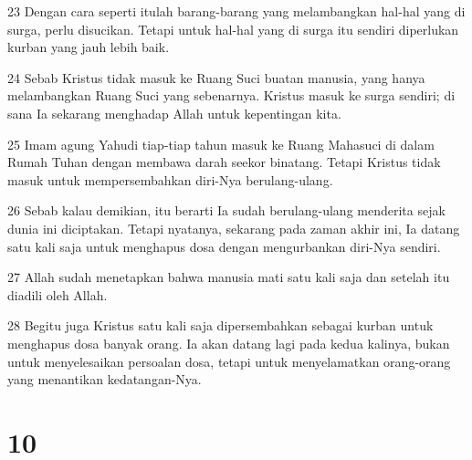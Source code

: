 \par 23 Dengan cara seperti itulah barang-barang yang melambangkan hal-hal yang di surga, perlu disucikan. Tetapi untuk hal-hal yang di surga itu sendiri diperlukan kurban yang jauh lebih baik.
\par 24 Sebab Kristus tidak masuk ke Ruang Suci buatan manusia, yang hanya melambangkan Ruang Suci yang sebenarnya. Kristus masuk ke surga sendiri; di sana Ia sekarang menghadap Allah untuk kepentingan kita.
\par 25 Imam agung Yahudi tiap-tiap tahun masuk ke Ruang Mahasuci di dalam Rumah Tuhan dengan membawa darah seekor binatang. Tetapi Kristus tidak masuk untuk mempersembahkan diri-Nya berulang-ulang.
\par 26 Sebab kalau demikian, itu berarti Ia sudah berulang-ulang menderita sejak dunia ini diciptakan. Tetapi nyatanya, sekarang pada zaman akhir ini, Ia datang satu kali saja untuk menghapus dosa dengan mengurbankan diri-Nya sendiri.
\par 27 Allah sudah menetapkan bahwa manusia mati satu kali saja dan setelah itu diadili oleh Allah.
\par 28 Begitu juga Kristus satu kali saja dipersembahkan sebagai kurban untuk menghapus dosa banyak orang. Ia akan datang lagi pada kedua kalinya, bukan untuk menyelesaikan persoalan dosa, tetapi untuk menyelamatkan orang-orang yang menantikan kedatangan-Nya.

\chapter{10}

